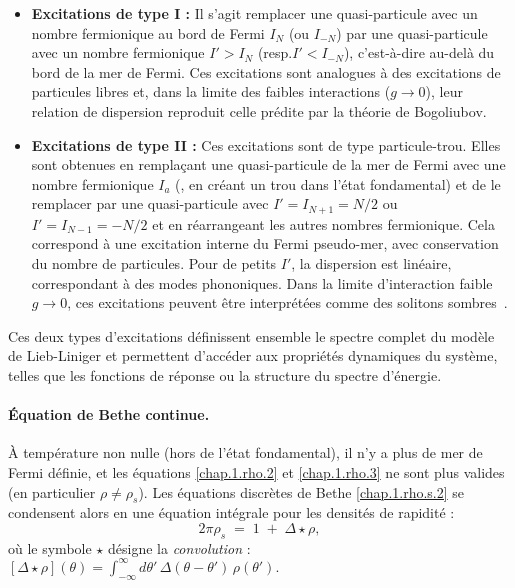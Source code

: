\begin{itemize}
    \item \textbf{Excitations de type I :} Il s’agit remplacer une quasi-particule avec un nombre fermionique au bord de Fermi $I_{N}$ (ou $I_{-N}$) par une quasi-particule avec un nombre fermionique $I'> I_N$ (resp.$I' <I_{-N}$), c’est-à-dire au-delà du bord de la mer de Fermi. Ces excitations sont analogues à des excitations de particules libres et, dans la limite des faibles interactions ($g \to 0$), leur relation de dispersion reproduit celle prédite par la théorie de Bogoliubov.

    \item \textbf{Excitations de type II :} Ces excitations sont de type particule-trou. Elles sont obtenues en remplaçant une quasi-particule de la mer de Fermi avec une nombre fermionique $I_a$ (\ie, en créant un trou dans l’état fondamental) et de le remplacer par une quasi-particule avec $I' = I_{N+1} = N/2$ ou $I' = I_{N-1} = -N/2$ et en réarrangeant les autres nombres fermionique. Cela correspond à une excitation interne du Fermi pseudo-mer, avec conservation du nombre de particules. Pour de petits $I'$, la dispersion est linéaire, correspondant à des modes phononiques. Dans la limite d’interaction faible \( g \to 0 \), ces excitations peuvent être interprétées comme des solitons sombres~\cite{Kulish1976}.
\end{itemize}

Ces deux types d’excitations définissent ensemble le spectre complet du modèle de Lieb-Liniger et permettent d’accéder aux propriétés dynamiques du système, telles que les fonctions de réponse ou la structure du spectre d’énergie.

\paragraph{Équation de Bethe continue.}

À température non nulle (hors de l’état fondamental), il n’y a plus de mer de Fermi définie, et les équations \eqref{chap.1.rho.2} et \eqref{chap.1.rho.3} ne sont plus valides (en particulier $\rho \neq \rho_s$). Les équations discrètes de Bethe \eqref{chap.1.rho.s.2} se condensent alors en une équation intégrale pour les densités de rapidité :
\
\begin{equation}
	2\pi \rho_s \;=\; 1 \;+\;\Delta \star \rho,
\label{eq:TBA-rhos}
\end{equation}
où le symbole $\star$ désigne la \emph{convolution} :
\(
	[\Delta \star \rho](\theta) = \int_{-\infty}^{\infty} d\theta' \, \Delta(\theta - \theta') \, \rho(\theta').
\)

